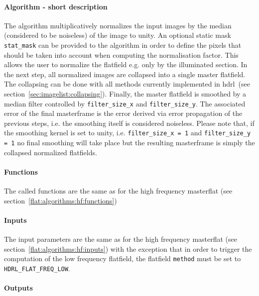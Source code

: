 \paragraph{Algorithm - short description}
\label{flat:algorithms:lf:short}

The algorithm multiplicatively normalizes the input images by the
median (considered to be noiseless) of the image to unity. An optional
static mask \verb,stat_mask, can be provided to the algorithm in order
to define the pixels that should be taken into account when computing
the normalisation factor. This allows the user to normalize the
flatfield e.g. only by the illuminated section. In the next step, all
normalized images are collapsed into a single master flatfield. The
collapsing can be done with all methods currently implemented in
hdrl~(see section~\ref{sec:imagelist:collapsing}). Finally, the master
flatfield is smoothed by a median filter controlled by
\verb,filter_size_x, and \verb,filter_size_y,. The associated error of
the final masterframe is the error derived via error propagation of
the previous steps, i.e. the smoothing itself is considered
noiseless. Please note that, if the smoothing kernel is set to unity,
i.e. \verb,filter_size_x = 1, and \verb,filter_size_y = 1, no final
smoothing will take place but the resulting masterframe is simply the
collapsed normalized flatfields.

\paragraph{Functions}
\label{flat:algorithms:lf:functions}

The called functions are the same as for the high frequency
masterflat (see section~\ref{flat:algorithms:hf:functions})

\paragraph{Inputs}
\label{flat:algorithms:lf:inputs}

The input parameters are the same as for the high frequency masterflat
(see section~\ref{flat:algorithms:hf:inputs}) with the exception that
in order to trigger the computation of the low frequency flatfield,
the flatfield \verb+method+ must be set to \verb+HDRL_FLAT_FREQ_LOW+.

\paragraph{Outputs}
\label{flat:algorithms:lf:outputs}

